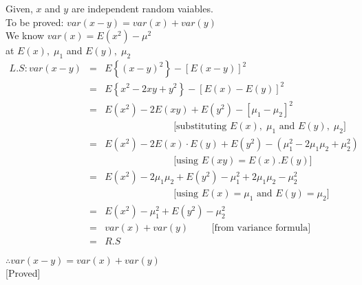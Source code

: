 \documentclass{article}
\begin{document}
\Large{
    Given, $x$ and $y$ are independent random vaiables. \\
    To be proved: $var (x-y) = var(x) + var(y)$\\
    We know $var(x) = E(x^2)-\mu^2$\\
    at $E(x),\;\mu_1$ and $E(y),\;\mu_2$\\
    \begin{eqnarray*}
        L.S: var(x-y) &=& E\left\{(x-y)^2\right\} -\left[E(x-y)\right]^2\\
        &=& E\left\{x^2-2xy+y^2\right\}-\left[E(x)-E(y)\right]^2\\
        &=& E(x^2) - 2E(xy) + E(y^2)- [\mu_1 - \mu_2]^2\\
        && \hspace{3cm}\text{[substituting $E(x),\;\mu_1$ and $E(y),\;\mu_2$]}\\
        &=& E(x^2) - 2E(x)\cdot E(y)+ E(y^2)-\left(\mu_1^2 - 2\mu_1\mu_2 + \mu_2^2\right)\\
        && \hspace{3cm}\text{[using $E(xy)=E(x).E(y)$]}\\
        &=& E(x^2)-2\mu_1\mu_2+E(y^2)-\mu_1^2+2\mu_1\mu_2 -\mu_2^2\\
        && \hspace{3cm}\text{[using $E(x)=\mu_1$ and $E(y)= \mu_2$]}\\
        &=& E(x^2)-\mu_1^2+E(y^2)-\mu_2^2\\
        &=& var(x)+var(y) \hspace{1cm}\text{[from variance formula]}\\
        &=& R.S
    \end{eqnarray*}

$\therefore var(x-y) = var(x) + var(y)$\\

\hspace{7cm}[Proved]

}
\end{document}
